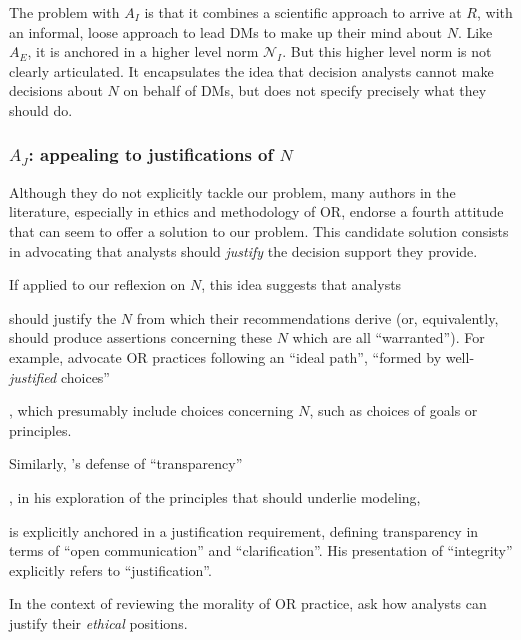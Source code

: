 \documentclass[preprint, french, english, 11pt, authoryear]{elsarticle}%
\newcommand{\protectforpdf}[1]{\texorpdfstring{\ensuremath{#1}}{#1}}
\newcommand{\possessivecite}[1]{\citeauthor{#1}’s \citeyearpar{#1}}
\begin{document}
The problem with $A_I$ is that it combines a scientific approach to arrive at $R$, with an informal, loose approach to lead \acp{DM} to make up their mind about $N$.
Like $A_E$, it is anchored in a higher level norm $\mathscr{N}_I$. But this higher level norm is not clearly articulated. It encapsulates the idea that decision analysts cannot make decisions about $N$ on behalf of \acp{DM}, but does not specify precisely what they should do.



\subsubsection{\texorpdfstring{$A_J$}{AJ}: appealing to justifications of \protectforpdf{N}}



Although they do not explicitly tackle our problem, many authors in the literature, especially in ethics and methodology of \ac{OR}, endorse a fourth attitude that can seem to offer a solution to our problem. This candidate solution consists in advocating that analysts should \emph{justify} the decision support they provide. \begin{changebar} If applied to our reflexion on $N$, this idea suggests that analysts \end{changebar}should justify the $N$ from which their recommendations derive (or, equivalently, should produce assertions concerning these $N$ which are all ``warranted'').
For example, \citet{lahtinen_why_2017} advocate \ac{OR} practices following an ``ideal path'', ``formed by well-\emph{justified} choices''\begin{changebar}, which presumably include choices concerning $N$, such as choices of goals or principles.\end{changebar}
Similarly, \possessivecite{diekmann_moral_2013} defense of ``transparency''\begin{changebar}, in his exploration of the principles that should underlie modeling,\end{changebar} is explicitly anchored in a justification requirement, defining transparency in terms of ``open communication'' and ``clarification''. His presentation of ``integrity'' explicitly refers to ``justification''.
\begin{changebar}In the context of reviewing the morality of \ac{OR} practice, \citet{ormerod_operational_2013} ask how analysts can justify their \emph{ethical} positions.\end{changebar}
\end{document}
